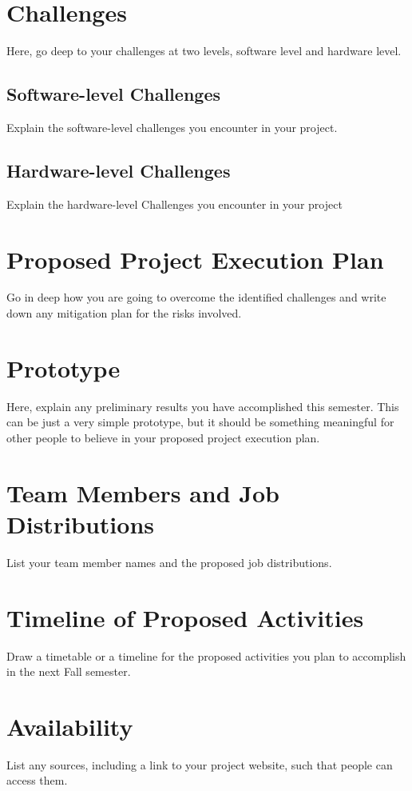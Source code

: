 \documentclass[conference, final]{IEEEtran}
\begin{document}
\section{Challenges}

Here, go deep to your challenges at two levels, software level and hardware level.


\subsection{Software-level Challenges}

Explain the software-level challenges you encounter in your project.

\subsection{Hardware-level Challenges}

Explain the hardware-level Challenges you encounter in your project

\section{Proposed Project Execution Plan}

Go in deep how you are going to overcome the identified challenges and
write down any mitigation plan for the risks involved.

\section{Prototype}

Here, explain any preliminary results you have accomplished this semester.
This can be just a very simple prototype, but it should be something
meaningful for other people to believe in your proposed project execution plan.

\section{Team Members and Job Distributions}

List your team member names and the proposed job distributions.

\section{Timeline of Proposed Activities}

Draw a timetable or a timeline for the proposed activities 
you plan to accomplish in the next Fall semester.

\section{Availability}

List any sources, including a link to your project website,
such that people can access them.




%
%
\end{document}
